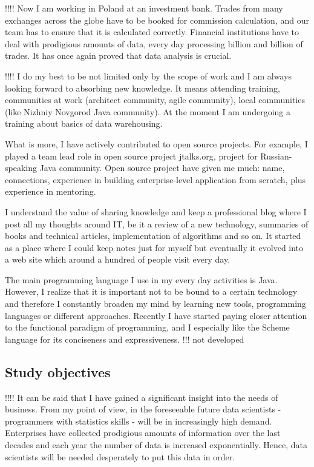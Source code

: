 \documentclass[a4paper,14pt]{extarticle}
\begin{document}
!!!!
Now I am working in Poland at an investment bank. Trades from many exchanges across the globe have to be booked for commission calculation, and our team has to ensure that it is calculated correctly. Financial institutions have to deal with prodigious amounts of data, every day processing billion and billion of trades. It has once again proved that data analysis is crucial.


!!!!
I do my best to be not limited only by the scope of work and I am always looking forward to absorbing new knowledge. It means attending training, communities at work (architect community, agile community), local communities (like Nizhniy Novgorod Java community). At the moment I am undergoing a training about basics of data warehousing.

What is more, I have actively contributed to open source projects. For example, I played a team lead role in open source project jtalks.org, project for Russian-speaking Java community. Open source project have given me much: name, connections, experience in building enterprise-level application from scratch, plus experience in mentoring.

I understand the value of sharing knowledge and keep a professional blog where I post all my thoughts around IT, be it a review of a new technology,  summaries of books and technical articles, implementation of algorithms and so on. It started as a place where I could keep notes just for myself but eventually it evolved into a web site which around a hundred of people visit every day.

The main programming language I use in my every day activities is Java. However, I realize that it is important not to be bound to a certain technology and therefore I constantly broaden my mind by learning new tools, programming languages or different approaches. Recently I have started paying closer attention to the functional paradigm of programming, and I especially like the Scheme language for its conciseness and expressiveness. !!! not developed



\subsection*{Study objectives}

!!!!
It can be said that I have gained a significant insight into the needs of business. From my point of view, in the foreseeable future data scientists - programmers with statistics skills - will be in increasingly high demand. Enterprises have collected prodigious amounts of information over the last decades and each year the number of data is increased exponentially. Hence, data scientists will be needed desperately to put this data in order. 
\end{document}
